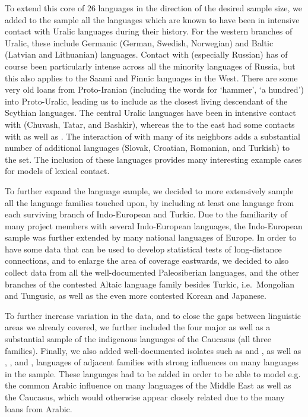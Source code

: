 To extend this core of 26 languages in the direction of the desired sample size, we added to the sample all the languages which are known to have been in intensive contact with Uralic languages during their history. For the western branches of Uralic, these include Germanic (German, Swedish, Norwegian) and Baltic (Latvian and Lithuanian) languages. Contact with  (especially Russian) has of course been particularly intense across all the minority languages of Russia, but this also applies to the Saami and Finnic languages in the West. There are some very old loans from Proto-Iranian (including the words for `hammer', `a hundred') into Proto-Uralic, leading us to include  as the closest living descendant of the Scythian languages. The central Uralic languages have been in intensive contact with  (Chuvash, Tatar, and Bashkir), whereas the  to the east had some contacts with  as well as . The interaction of  with many of its neighbors adds a substantial number of additional languages (Slovak, Croatian, Romanian, and Turkish) to the set. The inclusion of these languages provides many interesting example cases for models of lexical contact.

To further expand the language sample, we decided to more extensively sample all the language families touched upon, by including at least one language from each surviving branch of Indo-European and Turkic. Due to the familiarity of many project members with several Indo-European languages, the Indo-European sample was further extended by many national languages of Europe. In order to have some data that can be used to develop statistical tests of long-distance connections, and to enlarge the area of coverage eastwards, we decided to also collect data from all the well-documented Paleosiberian languages, and the other branches of the contested Altaic language family besides Turkic, i.e.\ Mongolian and Tungusic, as well as the even more contested Korean and Japanese.

To further increase variation in the data, and to close the gaps between linguistic areas we already covered, we further included the four major  as well as a substantial sample of the indigenous languages of the Caucasus (all three families). Finally, we also added well-documented isolates such as  and , as well as , , and , languages of adjacent families with strong influences on many languages in the sample. These languages had to be added in order to be able to model e.g. the common Arabic influence on many languages of the Middle East as well as the Caucasus, which would otherwise appear closely related due to the many loans from Arabic.

